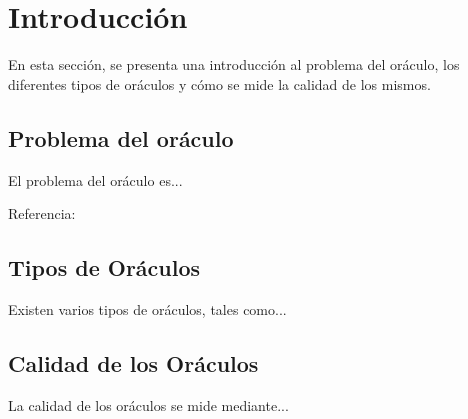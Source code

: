 \chapter{Introducción}

En esta sección, se presenta una introducción al problema del oráculo, los diferentes tipos de oráculos y cómo se mide la calidad de los mismos.

\section{Problema del oráculo}

El problema del oráculo es...

Referencia: \cite{harman_oracle}

\section{Tipos de Oráculos}

Existen varios tipos de oráculos, tales como...

\section{Calidad de los Oráculos}

La calidad de los oráculos se mide mediante...

